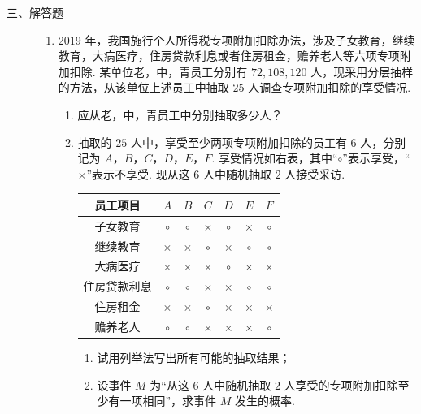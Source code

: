 \begin{description}

    \item[三、解答题]

    \begin{enumerate}[leftmargin=5pt]

      \addtocounter{enumi}{+14}

        \item 2019 年，我国施行个人所得税专项附加扣除办法，涉及子女教育，继续教育，大病医疗，住房贷款利息或者住房租金，赡养老人等六项专项附加扣除. 某单位老，中，青员工分别有 \(72,108,120\) 人，现采用分层抽样的方法，从该单位上述员工中抽取 \(25\) 人调查专项附加扣除的享受情况.

\begin{enumerate}
\item 应从老，中，青员工中分别抽取多少人？
\item 抽取的 \(25\) 人中，享受至少两项专项附加扣除的员工有 \(6\) 人，分别记为 \(A\)，\(B\)，\(C\)，\(D\)，\(E\)，\(F\). 享受情况如右表，其中“\(\circ\)”表示享受，“\(\times\)”表示不享受. 现从这 \(6\) 人中随机抽取 \(2\) 人接受采访.
\begin{center}
\begin{tabular}{c|cccccc}
员工项目 & \(A\) & \(B\) & \(C\) & \(D\) & \(E\) & \(F\) \\
\hline
子女教育 & \(\circ\) & \(\circ\) & \(\times\) & \(\circ\) & \(\times\) & \(\circ\) \\
继续教育 & \(\times\) & \(\times\) & \(\circ\) & \(\times\) & \(\circ\) & \(\circ\) \\
大病医疗 & \(\times\) & \(\times\) & \(\times\) & \(\circ\) & \(\times\) & \(\times\) \\
住房贷款利息 & \(\circ\) & \(\circ\) & \(\times\) & \(\times\) & \(\circ\) & \(\circ\) \\
住房租金 & \(\times\) & \(\times\) & \(\circ\) & \(\times\) & \(\times\) & \(\times\) \\
赡养老人 & \(\circ\) & \(\circ\) & \(\times\) & \(\times\) & \(\times\) & \(\circ\)
\end{tabular}
\end{center}

\begin{enumerate}
\item 试用列举法写出所有可能的抽取结果；
\item 设事件 \(M\) 为“从这 \(6\) 人中随机抽取 \(2\) 人享受的专项附加扣除至少有一项相同”，求事件 \(M\) 发生的概率.
\end{enumerate}
\end{enumerate}


\end{enumerate}
\end{description}
